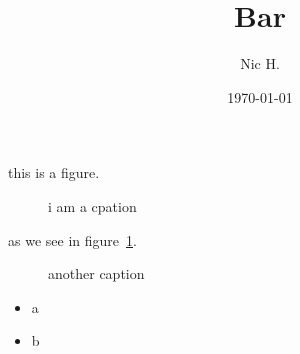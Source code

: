 \documentclass{beamer}
\title{Bar}
\author{Nic H.}
\date{\today}
\begin{document}
\begin{frame}
\maketitle
\end{frame}

\begin{frame}
this is a figure.

\begin{figure}[b]
    
    \caption{i am a cpation}
    \label{fig1}
\end{figure}

as we see in figure~\ref{fig1}.
\end{frame}

\begin{frame}
    \begin{figure}
        
        \caption{another caption}
    \end{figure}
    \begin{itemize}
        \item a
        \item b
    \end{itemize}
\end{frame}
\end{document}
